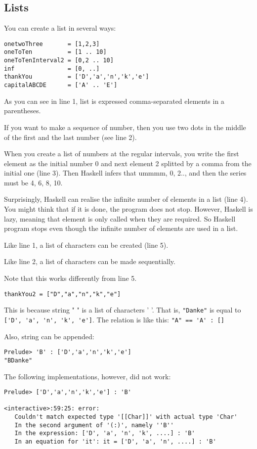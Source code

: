 \subsection{Lists}
You can create a list in several ways:
\begin{lstlisting}
onetwoThree       = [1,2,3]
oneToTen          = [1 .. 10]
oneToTenInterval2 = [0,2 .. 10]
inf               = [0, ..]
thankYou          = ['D','a','n','k','e']
capitalABCDE      = ['A' .. 'E']
\end{lstlisting}

As you can see in line 1, list is expressed comma-separated elements in a parentheses. 

If you want to make a sequence of number, then you use two dots in the middle of the first and the last number
 (see line 2). 

When you create a list of numbers at the regular intervals, you write the first element as the initial number 0 and next element 2 splitted by a comma from the initial one (line 3). 
Then Haskell infers that ummmm, 0, 2.., and then the series must be 4, 6, 8, 10.

Surprisingly, Haskell can realise the infinite number of elements in a list (line 4). 
You might think that if it is done, the program does not stop. 
However, Haskell is lazy, meaning that element is only called when they are required. 
So Haskell program stops even though the infinite number of elements are used in a list.

Like line 1, a list of characters can be created (line 5).

Like line 2, a list of characters can be made sequentially. 
   
Note that this works differently from line 5.
\begin{lstlisting}
thankYou2 = ["D","a","n","k","e"]
\end{lstlisting}

This is because string " " is a list of characters ' '. 
That is, \lstinline{"Danke"} is equal to \lstinline{['D', 'a', 'n', 'k', 'e']}. The relation is like this:
\lstinline{"A" == 'A' : []}

Also, string can be appended:
\begin{lstlisting}
Prelude> 'B' : ['D','a','n','k','e']
"BDanke"
\end{lstlisting}

The following implementations, however, did not work:
\begin{lstlisting}
Prelude> ['D','a','n','k','e'] : 'B'

<interactive>:59:25: error:
   Couldn't match expected type '[[Char]]' with actual type 'Char'
   In the second argument of '(:)', namely ''B''
   In the expression: ['D', 'a', 'n', 'k', ....] : 'B'
   In an equation for 'it': it = ['D', 'a', 'n', ....] : 'B'
\end{lstlisting}

